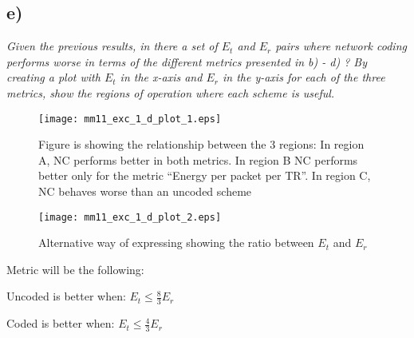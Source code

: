 \FloatBarrier
\subsection{e)} 
\textit{Given the previous results, in there a set of $E_t$ and $E_r$ pairs where network coding performs worse in terms of the different metrics presented in b) - d) ? By creating a plot with $E_t$ in the x-axis and $E_r$ in the y-axis for each of the three metrics, show the regions of operation where each scheme is useful.}

\begin{figure}[h!]
  \centering
  \texttt{[image: mm11\_exc\_1\_d\_plot\_1.eps]}
  \caption{Figure is showing the relationship between the 3 regions: In region A, NC performs better in both metrics. In region B NC performs better only for the metric ``Energy per packet per TR''. In region C, NC behaves worse than an uncoded scheme}
  \label{fig:mm11_exc_1_d_plot_1}
\end{figure}

\begin{figure}[h!]
  \centering
  \texttt{[image: mm11\_exc\_1\_d\_plot\_2.eps]}
  \caption{Alternative way of expressing  showing the ratio between $E_t$ and $E_r$}
  \label{fig:mm11_exc_1_d_plot_2}
\end{figure}

\FloatBarrier
Metric will be the following:
\begin{pitemize}
	\item Uncoded is better when: $E_t\leq\frac{8}{3}E_r$
	\item Coded is better when: $E_t\leq\frac{4}{3}E_r$
\end{pitemize}


